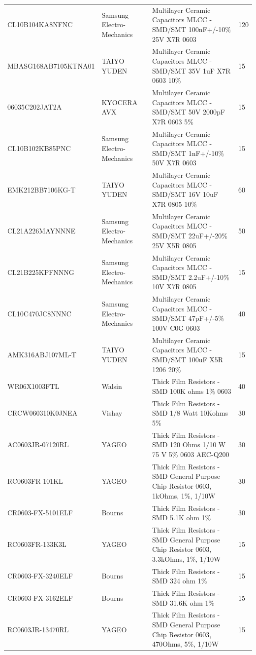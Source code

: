 \begin{landscape}
\begin{center}
\begin{longtable}{@{} p{6cm} p{5cm} p{10cm} p{2cm} @{}}
			CL10B104KA8NFNC & Samsung Electro-Mechanics & Multilayer Ceramic Capacitors MLCC - SMD/SMT 100nF+/-10\% 25V X7R 0603 & 120 \\
			MBASG168AB7105KTNA01 & TAIYO YUDEN & Multilayer Ceramic Capacitors MLCC - SMD/SMT 35V 1uF X7R 0603 10\% & 15 \\
			06035C202JAT2A & KYOCERA AVX & Multilayer Ceramic Capacitors MLCC - SMD/SMT 50V 2000pF X7R 0603 5\% & 15 \\
			CL10B102KB85PNC & Samsung Electro-Mechanics & Multilayer Ceramic Capacitors MLCC - SMD/SMT 1nF+/-10\% 50V X7R 0603 & 15 \\
			EMK212BB7106KG-T & TAIYO YUDEN & Multilayer Ceramic Capacitors MLCC - SMD/SMT 16V 10uF X7R 0805 10\% & 60 \\
			CL21A226MAYNNNE & Samsung Electro-Mechanics & Multilayer Ceramic Capacitors MLCC - SMD/SMT 22uF+/-20\% 25V X5R 0805 & 50 \\
			CL21B225KPFNNNG & Samsung Electro-Mechanics & Multilayer Ceramic Capacitors MLCC - SMD/SMT 2.2uF+/-10\% 10V X7R 0805 & 15 \\
			CL10C470JC8NNNC & Samsung Electro-Mechanics & Multilayer Ceramic Capacitors MLCC - SMD/SMT 47pF+/-5\% 100V C0G 0603 & 40 \\
			AMK316ABJ107ML-T & TAIYO YUDEN & Multilayer Ceramic Capacitors MLCC - SMD/SMT 100uF X5R 1206 20\% & 15 \\
			WR06X1003FTL & Walsin & Thick Film Resistors - SMD 100K ohms 1\% 0603 & 40 \\
			CRCW060310K0JNEA & Vishay & Thick Film Resistors - SMD 1/8 Watt 10Kohms 5\% & 30 \\
			AC0603JR-07120RL & YAGEO & Thick Film Resistors - SMD 120 Ohms 1/10 W 75 V 5\% 0603 AEC-Q200 & 30 \\
			RC0603FR-101KL & YAGEO & Thick Film Resistors - SMD General Purpose Chip Resistor 0603, 1kOhms, 1\%, 1/10W & 30 \\
			CR0603-FX-5101ELF & Bourns & Thick Film Resistors - SMD 5.1K ohm 1\% & 30 \\
			RC0603FR-133K3L & YAGEO & Thick Film Resistors - SMD General Purpose Chip Resistor 0603, 3.3kOhms, 1\%, 1/10W & 15 \\
			CR0603-FX-3240ELF & Bourns & Thick Film Resistors - SMD 324 ohm 1\% & 15 \\
			CR0603-FX-3162ELF & Bourns & Thick Film Resistors - SMD 31.6K ohm 1\% & 15 \\
			RC0603JR-13470RL & YAGEO & Thick Film Resistors - SMD General Purpose Chip Resistor 0603, 470Ohms, 5\%, 1/10W & 15 \\

\end{longtable}
\end{center}
\end{landscape}
